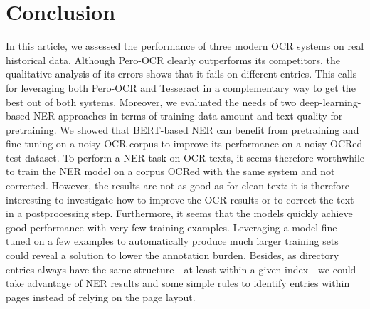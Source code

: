 \section{Conclusion}

In this article, we assessed the performance of three modern OCR systems on real historical data. Although Pero-OCR clearly outperforms its competitors, the qualitative analysis of its errors shows that it fails on different entries. This calls for leveraging both Pero-OCR and Tesseract in a complementary way to get the best out of both systems. Moreover, we evaluated the needs of two deep-learning-based NER approaches in terms of training data amount and text quality for pretraining. We showed that BERT-based NER can benefit from pretraining and fine-tuning on a noisy OCR corpus to improve its performance on a noisy OCRed test dataset. To perform a NER task on OCR texts, it seems therefore worthwhile to train the NER model on a corpus OCRed with the same system and not corrected. However, the results are not as good as for clean text: it is therefore interesting to investigate how to improve the OCR results or to correct the text in a postprocessing step. Furthermore, it seems that the models quickly achieve good performance with very few training examples. Leveraging a model fine-tuned on a few examples to automatically produce much larger training sets could reveal a solution to lower the annotation burden. Besides, as directory entries always have the same structure - at least within a given index - we could take advantage of NER results and some simple rules to identify entries within pages instead of relying on the page layout.
